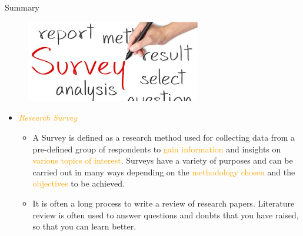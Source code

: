 \documentclass[
 size=14pt,
 paper=smartboard,  %
 mode=present, 		%
 display=slides, 	%
 style=tuliplab,  	%
 pauseslide,
 fleqn,leqno]{powerdot}{}
\begin{document}
\begin{slide}[toc=,bm=]{Summary}

\begin{figure}
  \centering
  \includegraphics[width=3in]{figures/management/survey.eps}\\
\end{figure}

  \begin{itemize}
    \item \textcolor{orange}{\textit{Research Survey}}
         \begin{itemize}
           \item A Survey is defined as a research method used for collecting data from a pre-defined group of respondents to \textcolor{orange}{gain information} and insights on \textcolor{orange}{various topics of interest}. Surveys have a variety of purposes and can be carried out in many ways depending on the \textcolor{orange}{methodology chosen} and the \textcolor{orange}{objectives} to be achieved.
           \item It is often a long process to write a review of research papers.
           Literature review is often used to answer questions and doubts that you have raised,
           so that you can learn better.
         \end{itemize}
  \end{itemize}
\end{slide}
\end{document}
